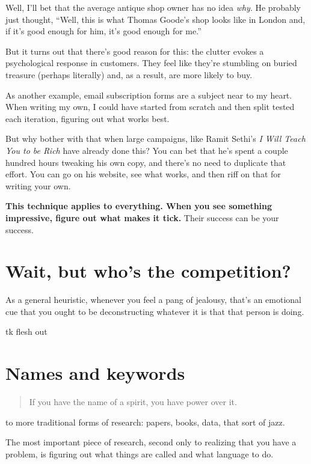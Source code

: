 Well, I'll bet that the average antique shop owner has no idea \textit{why}. He
probably just thought, ``Well, this is what Thomas Goode's shop looks like in
London and, if it's good enough for him, it's good enough for me.''

But it turns out that there's good reason for this: the clutter evokes a
psychological response in customers. They feel like they're stumbling on buried
treasure (perhaps literally) and, as a result, are more likely to buy.

As another example, email subscription forms are a subject near to my
heart. When writing my own, I could have started from scratch and then split
tested each iteration, figuring out what works best.

But why bother with that when large campaigns, like Ramit Sethi's \textit{I Will
  Teach You to be Rich} have already done this? You can bet that he's spent a
couple hundred hours tweaking his own copy, and there's no need to duplicate
that effort. You can go on his website, see what works, and then riff on that
for writing your own.

\textbf{This technique applies to everything. When you see something impressive,
  figure out what makes it tick.} Their success can be your success.

\section{Wait, but who's the competition?}

As a general heuristic, whenever you feel a pang of jealousy, that's an emotional cue that
you ought to be deconstructing whatever it is that that person is doing. 

tk flesh out

\section{Names and keywords}

\begin{quote}
  If you have the name of a spirit, you have power over it.
\end{quote}

 to more traditional forms of research: papers, books,
data, that sort of jazz.

The most important piece of research, second only to realizing that you have a
problem, is figuring out what things are called and what language to do.

